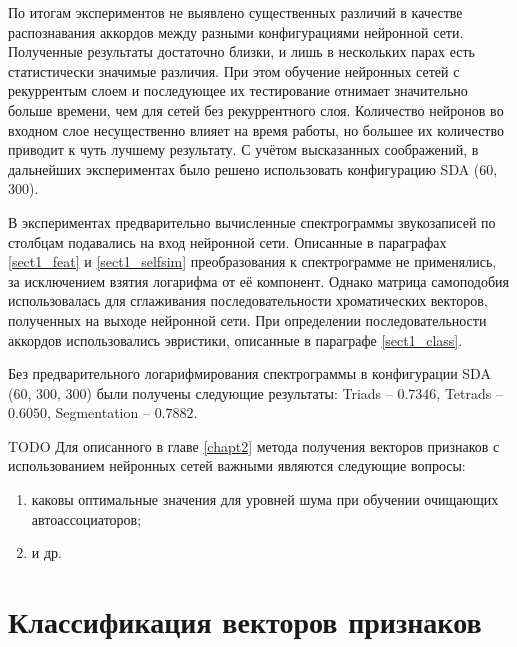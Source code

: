 По итогам экспериментов не выявлено существенных различий в качестве
распознавания аккордов между разными конфигурациями нейронной сети. Полученные
результаты достаточно близки, и лишь в нескольких парах есть статистически
значимые различия. При этом обучение нейронных сетей с рекуррентым слоем и
последующее их тестирование отнимает значительно больше времени, чем для сетей
без рекуррентного слоя. Количество нейронов во входном слое несущественно влияет
на время работы, но большее их количество приводит к чуть лучшему результату. С
учётом высказанных соображений, в дальнейших экспериментах было решено
использовать конфигурацию SDA (60, 300).

В экспериментах предварительно вычисленные спектрограммы звукозаписей по
столбцам подавались на вход нейронной сети. Описанные в параграфах
\ref{sect1_feat} и \ref{sect1_selfsim} преобразования к спектрограмме не
применялись, за исключением взятия логарифма от её компонент. Однако матрица
самоподобия использовалась для сглаживания последовательности хроматических
векторов, полученных на выходе нейронной сети. При определении
последовательности аккордов использовались эвристики, описанные в параграфе
\ref{sect1_class}.

Без предварительного логарифмирования спектрограммы в конфигурации SDA (60,
300, 300) были получены следующие результаты: Triads -- $0.7346$, Tetrads --
$0.6050$, Segmentation -- $0.7882$.

TODO Для описанного в главе \ref{chapt2} метода получения векторов признаков с
использованием нейронных сетей важными являются следующие вопросы:
\begin{enumerate}
  \item каковы оптимальные значения для уровней шума при обучении очищающих
  автоассоциаторов;
  \item и др.
\end{enumerate}

\section{Классификация векторов признаков} \label{sect3_class}

